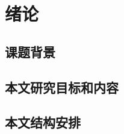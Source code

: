 \chapter{绪论}
\linespread{0.9}
\songti \xiaosi

\section{课题背景}

\section{本文研究目标和内容}

\section{本文结构安排}

% 
% 
